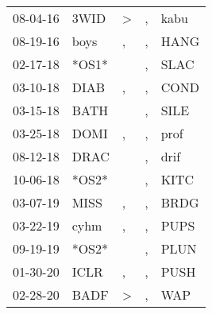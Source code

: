 \begin{supertabular}{p{0.07\textwidth}p{0.06\textwidth}p{0.02\textwidth}p{0.02\textwidth}p{0.06\textwidth}}
 08-04-16\textsuperscript{} &  3WID\textsuperscript{} &     \textgreater &             , &           kabu\textsuperscript{} \\
 08-19-16\textsuperscript{} &  boys\textsuperscript{} &                , &             , &           HANG\textsuperscript{} \\
 02-17-18\textsuperscript{} &                   *OS1* &                  &             , &           SLAC\textsuperscript{} \\
 03-10-18\textsuperscript{} &  DIAB\textsuperscript{} &                , &             , &           COND\textsuperscript{} \\
 03-15-18\textsuperscript{} &  BATH\textsuperscript{} &                  &             , &           SILE\textsuperscript{} \\
 03-25-18\textsuperscript{} &  DOMI\textsuperscript{} &                , &             , &           prof\textsuperscript{} \\
 08-12-18\textsuperscript{} &  DRAC\textsuperscript{} &                  &             , &           drif\textsuperscript{} \\
 10-06-18\textsuperscript{} &                   *OS2* &                  &             , &           KITC\textsuperscript{} \\
 03-07-19\textsuperscript{} &  MISS\textsuperscript{} &                , &             , &           BRDG\textsuperscript{} \\
 03-22-19\textsuperscript{} &  cyhm\textsuperscript{} &                , &             , &           PUPS\textsuperscript{} \\
 09-19-19\textsuperscript{} &                   *OS2* &                  &             , &           PLUN\textsuperscript{} \\
 01-30-20\textsuperscript{} &  ICLR\textsuperscript{} &                , &             , &           PUSH\textsuperscript{} \\
 02-28-20\textsuperscript{} &  BADF\textsuperscript{} &     \textgreater &             , &            WAP\textsuperscript{} \\
\end{supertabular}
